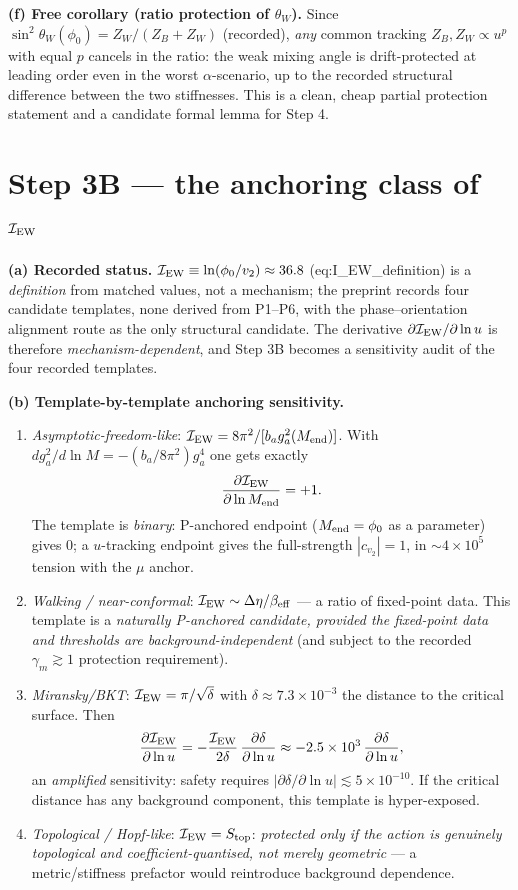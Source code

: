 \documentclass[11pt,a4paper]{article}
\begin{document}
\textbf{(f) Free corollary (ratio protection of $\theta_W$).} Since
$\sin^2\theta_W(\phi_0)=Z_W/(Z_B+Z_W)$ (recorded), \emph{any} common tracking
$Z_B,Z_W\propto u^{p}$ with equal $p$ cancels in the ratio: the weak mixing angle
is drift-protected at leading order even in the worst $\alpha$-scenario, up to the
recorded structural difference between the two stiffnesses. This is a clean,
cheap partial protection statement and a candidate formal lemma for Step 4.

\section{Step 3B --- the anchoring class of $\mathcal I_{\rm EW}$}
\textbf{(a) Recorded status.} $\mathcal I_{\rm EW}\equiv\ln(\phi_0/v_2)\approx36.8$
(eq:I\_EW\_definition) is a \emph{definition} from matched values, not a mechanism;
the preprint records four candidate templates, none derived from P1--P6, with the
phase--orientation alignment route as the only structural candidate. The derivative
$\partial\mathcal I_{\rm EW}/\partial\ln u$ is therefore
\emph{mechanism-dependent}, and Step 3B becomes a sensitivity audit of the four
recorded templates.

\textbf{(b) Template-by-template anchoring sensitivity.}
\begin{enumerate}[leftmargin=1.9em,itemsep=2pt,label=(\roman*)]
\item \emph{Asymptotic-freedom-like}: $\mathcal I_{\rm EW}=8\pi^2/[b_a
g_a^2(M_{\rm end})]$. With $dg_a^2/d\ln M=-(b_a/8\pi^2)g_a^4$ one gets exactly
\[
\frac{\partial\mathcal I_{\rm EW}}{\partial\ln M_{\rm end}}=+1 .
\]
The template is \emph{binary}: P-anchored endpoint ($M_{\rm end}=\phi_0$ as a
parameter) gives $0$; a $u$-tracking endpoint gives the full-strength
$|c_{v_2}|=1$, in $\sim4\times10^{5}$ tension with the $\mu$ anchor.
\item \emph{Walking / near-conformal}: $\mathcal I_{\rm EW}\sim\Delta\eta/
\beta_{\rm eff}$ --- a ratio of fixed-point data. This template is a \emph{naturally P-anchored candidate, provided the fixed-point
data and thresholds are background-independent} (and subject to the recorded
$\gamma_m\gtrsim1$ protection requirement).
\item \emph{Miransky/BKT}: $\mathcal I_{\rm EW}=\pi/\sqrt\delta$ with
$\delta\approx7.3\times10^{-3}$ the distance to the critical surface. Then
\[
\frac{\partial\mathcal I_{\rm EW}}{\partial\ln u}
=-\frac{\mathcal I_{\rm EW}}{2\delta}\,\frac{\partial\delta}{\partial\ln u}
\approx-2.5\times10^{3}\,\frac{\partial\delta}{\partial\ln u},
\]
an \emph{amplified} sensitivity: safety requires
$|\partial\delta/\partial\ln u|\lesssim5\times10^{-10}$. If the critical distance
has any background component, this template is hyper-exposed.
\item \emph{Topological / Hopf-like}: $\mathcal I_{\rm EW}=S_{\rm top}$:
\emph{protected only if the action is genuinely topological and
coefficient-quantised, not merely geometric} --- a metric/stiffness prefactor
would reintroduce background dependence.
\end{enumerate}
\end{document}
